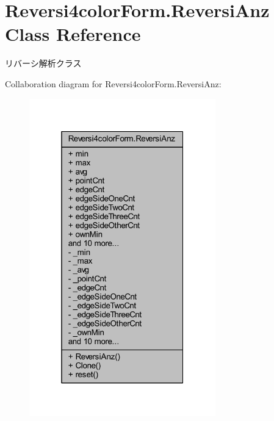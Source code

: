 \hypertarget{class_reversi4color_form_1_1_reversi_anz}{}\section{Reversi4color\+Form.\+Reversi\+Anz Class Reference}
\label{class_reversi4color_form_1_1_reversi_anz}


リバーシ解析クラス  




Collaboration diagram for Reversi4color\+Form.\+Reversi\+Anz\+:\nopagebreak
\begin{figure}[H]
\begin{center}
\leavevmode
\includegraphics[width=229pt]{class_reversi4color_form_1_1_reversi_anz__coll__graph}
\end{center}
\end{figure}
